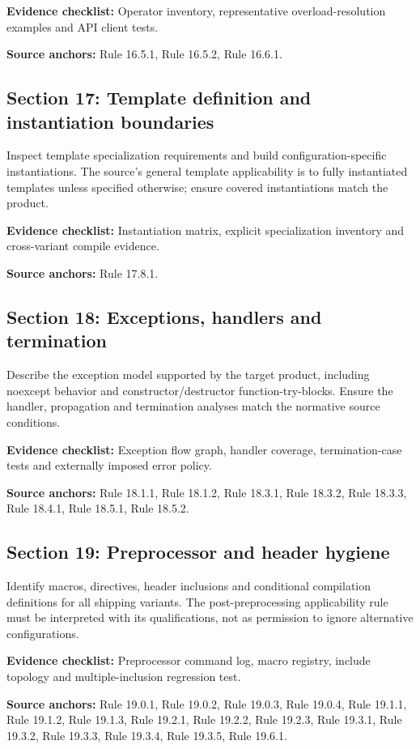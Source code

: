 \documentclass[10pt,letterpaper]{article}
\begin{document}
\textbf{Evidence checklist:} Operator inventory, representative overload-resolution examples and API client tests.

\textbf{Source anchors:} Rule 16.5.1, Rule 16.5.2, Rule 16.6.1.

\subsection{Section 17: Template definition and instantiation boundaries}
Inspect template specialization requirements and build configuration-specific instantiations. The source's general template applicability is to fully instantiated templates unless specified otherwise; ensure covered instantiations match the product.

\textbf{Evidence checklist:} Instantiation matrix, explicit specialization inventory and cross-variant compile evidence.

\textbf{Source anchors:} Rule 17.8.1.

\subsection{Section 18: Exceptions, handlers and termination}
Describe the exception model supported by the target product, including noexcept behavior and constructor/destructor function-try-blocks. Ensure the handler, propagation and termination analyses match the normative source conditions.

\textbf{Evidence checklist:} Exception flow graph, handler coverage, termination-case tests and externally imposed error policy.

\textbf{Source anchors:} Rule 18.1.1, Rule 18.1.2, Rule 18.3.1, Rule 18.3.2, Rule 18.3.3, Rule 18.4.1, Rule 18.5.1, Rule 18.5.2.

\subsection{Section 19: Preprocessor and header hygiene}
Identify macros, directives, header inclusions and conditional compilation definitions for all shipping variants. The post-preprocessing applicability rule must be interpreted with its qualifications, not as permission to ignore alternative configurations.

\textbf{Evidence checklist:} Preprocessor command log, macro registry, include topology and multiple-inclusion regression test.

\textbf{Source anchors:} Rule 19.0.1, Rule 19.0.2, Rule 19.0.3, Rule 19.0.4, Rule 19.1.1, Rule 19.1.2, Rule 19.1.3, Rule 19.2.1, Rule 19.2.2, Rule 19.2.3, Rule 19.3.1, Rule 19.3.2, Rule 19.3.3, Rule 19.3.4, Rule 19.3.5, Rule 19.6.1.
\end{document}
